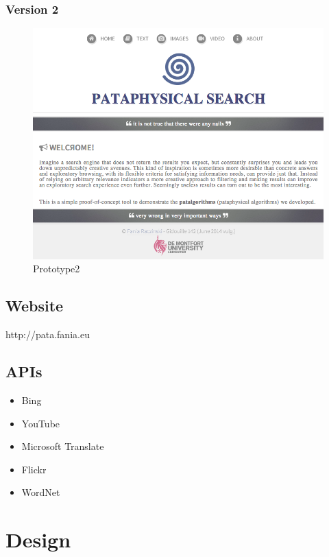 \subsubsection{Version 2}

\begin{figure}[!htb] %
\centering
\includegraphics[width=\textwidth]{images/pata2.png}
\caption[Prototype2]{Prototype2}
\label{fig:Prototype2}
\end{figure}


\subsection{Website}

http://pata.fania.eu

\subsection{APIs}

\begin{itemize}
  \item Bing
  \item YouTube
  \item Microsoft Translate
  \item Flickr
  \item WordNet
\end{itemize}

\section{Design}

